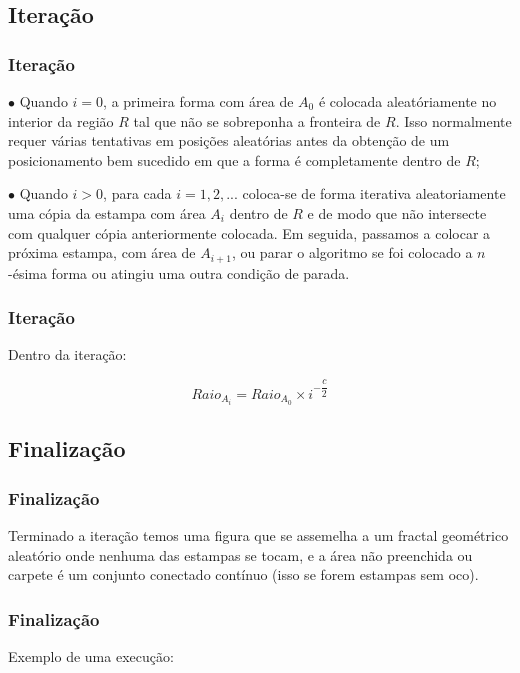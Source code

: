 \documentclass[aspectratio=169]{beamer}
\begin{document}
\subsection{Iteração}
\begin{frame}
\frametitle{Iteração}

$\bullet$ Quando $i = 0$, a primeira forma com área de $A_{0}$ é colocada aleatóriamente no interior da região $R$ tal que não se sobreponha a fronteira de $R$. Isso normalmente requer várias tentativas em posições aleatórias antes da obtenção de um posicionamento bem sucedido em que a forma é completamente dentro de $R$;
\medskip
\pause

$\bullet$ Quando $i > 0$, para cada $i = 1, 2, ...$ coloca-se de forma iterativa aleatoriamente uma cópia da estampa com área $A_{i}$ dentro de $R$ e de modo que não intersecte com qualquer cópia anteriormente colocada. Em seguida, passamos a colocar a próxima estampa, com área de $A_{i + 1}$, ou parar o algoritmo se foi colocado a $n$-ésima forma ou atingiu uma outra condição de parada.
\medskip

\end{frame}

\begin{frame}
\frametitle{Iteração}

Dentro da iteração:
\medskip

\begin{equation}
Raio_{A_{i}}= Raio_{A_{0}} \times i^{-\dfrac{c}{2}} 
\end{equation}
\medskip

\end{frame}

\subsection{Finalização}
\begin{frame}
\frametitle{Finalização}
Terminado a iteração temos uma figura que se assemelha a um fractal geométrico aleatório onde nenhuma das estampas se tocam, e a área não preenchida ou carpete é um conjunto conectado contínuo (isso se forem estampas sem oco).

\end{frame}

\begin{frame}
\frametitle{Finalização}

Exemplo de uma execução:

\end{frame}
\end{document}
